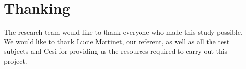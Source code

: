 \documentclass[12pt, openany, twocolumn]{article}
\begin{document}
\section{Thanking}

The research team would like to thank everyone who made this study possible. We would like to thank Lucie Martinet, our referent, as well as all the test subjects and Cesi for providing us the resources required to carry out this project.



\end{document}
